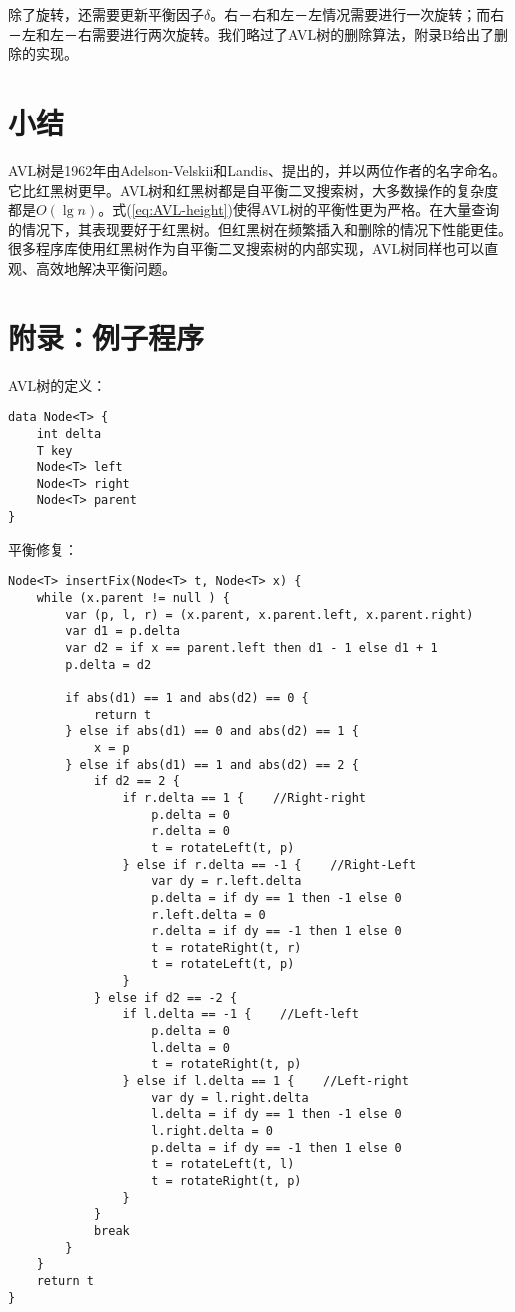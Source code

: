 \documentclass[b5paper]{ctexart}
\begin{document}
除了旋转，还需要更新平衡因子$\delta$。右－右和左－左情况需要进行一次旋转；而右－左和左－右需要进行两次旋转。我们略过了AVL树的删除算法，附录B给出了删除的实现。

\section{小结}
AVL树是1962年由Adelson-Velskii和Landis\cite{wiki-avl}、\cite{TFATP}提出的，并以两位作者的名字命名。它比红黑树更早。AVL树和红黑树都是自平衡二叉搜索树，大多数操作的复杂度都是$O(\lg n)$。式(\ref{eq:AVL-height})使得AVL树的平衡性更为严格。在大量查询的情况下，其表现要好于红黑树\cite{wiki-avl}。但红黑树在频繁插入和删除的情况下性能更佳。很多程序库使用红黑树作为自平衡二叉搜索树的内部实现，AVL树同样也可以直观、高效地解决平衡问题。

\section{附录：例子程序}

AVL树的定义：

\begin{lstlisting}[language = Bourbaki]
data Node<T> {
    int delta
    T key
    Node<T> left
    Node<T> right
    Node<T> parent
}
\end{lstlisting}

平衡修复：

\begin{lstlisting}[language = Bourbaki]
Node<T> insertFix(Node<T> t, Node<T> x) {
    while (x.parent != null ) {
        var (p, l, r) = (x.parent, x.parent.left, x.parent.right)
        var d1 = p.delta
        var d2 = if x == parent.left then d1 - 1 else d1 + 1
        p.delta = d2

        if abs(d1) == 1 and abs(d2) == 0 {
            return t
        } else if abs(d1) == 0 and abs(d2) == 1 {
            x = p
        } else if abs(d1) == 1 and abs(d2) == 2 {
            if d2 == 2 {
                if r.delta == 1 {    //Right-right
                    p.delta = 0
                    r.delta = 0
                    t = rotateLeft(t, p)
                } else if r.delta == -1 {    //Right-Left
                    var dy = r.left.delta
                    p.delta = if dy == 1 then -1 else 0
                    r.left.delta = 0
                    r.delta = if dy == -1 then 1 else 0
                    t = rotateRight(t, r)
                    t = rotateLeft(t, p)
                }
            } else if d2 == -2 {
                if l.delta == -1 {    //Left-left
                    p.delta = 0
                    l.delta = 0
                    t = rotateRight(t, p)
                } else if l.delta == 1 {    //Left-right
                    var dy = l.right.delta
                    l.delta = if dy == 1 then -1 else 0
                    l.right.delta = 0
                    p.delta = if dy == -1 then 1 else 0
                    t = rotateLeft(t, l)
                    t = rotateRight(t, p)
                }
            }
            break
        }
    }
    return t
}
\end{lstlisting}
\end{document}
